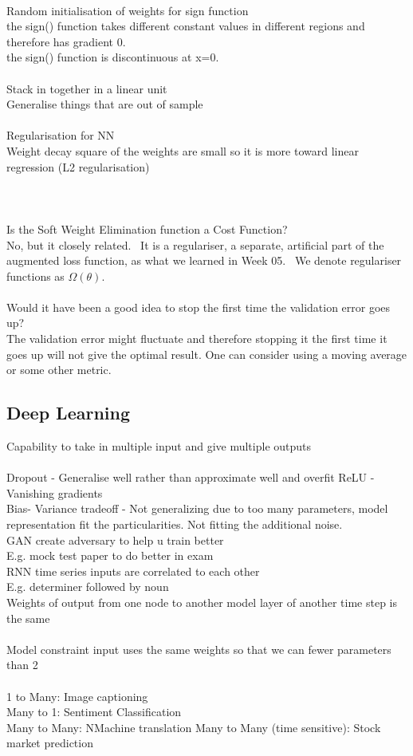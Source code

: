 \documentclass[11pt]{article}
\begin{document}
\\
Random initialisation of weights for sign function\\
the sign() function takes different constant values in different regions and therefore has gradient 0.\\
the sign() function is discontinuous at x=0.\\
\\
Stack in together in a linear unit\\
Generalise things that are out of sample\\
\\
Regularisation for NN\\
Weight decay square of the weights are small so it is more toward linear regression (L2 regularisation) \\
\\
\\
\\
Is the Soft Weight Elimination function a Cost Function?\\
No, but it closely related.  It is a regulariser, a separate, artificial part of the augmented loss function, as what we learned in Week 05.  We denote regulariser functions as $\Omega(\theta)$.
\\\\
Would it have been a good idea to stop the first time the validation error goes up?\\
The validation error might fluctuate and therefore stopping it the first time it goes up will not give the optimal result. One can consider using a moving average or some other metric.\\
\subsection*{Deep Learning}
Capability to take in multiple input and give multiple outputs\\\\
Dropout - Generalise well rather than approximate well and overfit
ReLU - Vanishing gradients
\\
Bias- Variance tradeoff - Not generalizing due to too many parameters, model representation fit the particularities. Not fitting the additional noise.
\\
GAN create adversary to help u train better\\
E.g. mock test paper to do better in exam
\\
RNN time series inputs are correlated to each other\\
E.g. determiner followed by noun
\\
Weights of output from one node to another model layer of another time step is the same \\
\\
Model constraint input uses the same weights so that we can fewer parameters than 2
\\
\\
1 to Many: Image captioning\\
Many to 1: Sentiment Classification\\
Many to Many: NMachine translation
Many to Many (time sensitive): Stock market prediction\\
\\
\end{document}
